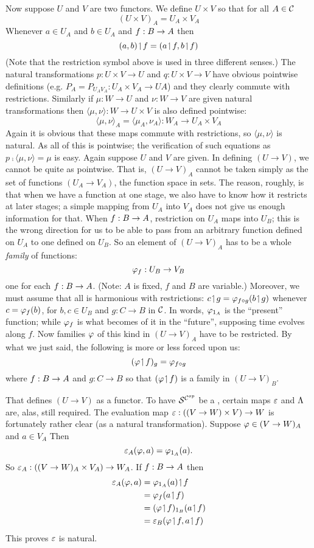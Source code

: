 Now suppose $U$ and $V$ are two functors. We define $U \times V$ so that for all $A \in \mathcal C$
$$
(U \times V)_A = U_A \times V_A
$$
%
Whenever $a \in U_A$ and $b \in U_A$ and $f: B \rightarrow A$ then
$$
(a,b) \!\upharpoonleft\! f = (a \!\upharpoonleft\! f, b \!\upharpoonleft\! f)
$$
(Note that the restriction symbol above is used in three different senses.) The natural transformations $p : U \times V \to U$ and $q: U\times V \to V$ have obvious pointwise definitions  (e.g. $P_A= P_{{U_A}{V_A}} : U_A \times V_A \to UA$) and they clearly commute with restrictions. Similarly if $\mu: W \to U$ and $\nu: W\to V$ are given natural transformations then $\langle \mu, \nu \rangle: W \to U \times V$ is also defined pointwise:
$$
{\langle \mu, \nu \rangle}_A = \langle \mu_A, \nu_A \rangle : W_A \to U_A \times V_A
$$
%
Again it is obvious that these maps commute with restrictions, so ${\langle \mu, \nu \rangle}$ is natural. As all of this is pointwise; the verifi­cation of such equations as $p \comp \langle \mu, \nu \rangle = \mu$ is easy. Again suppose $U$ and $V$ are given. In defining $(U \to V)$, we cannot be quite as pointwise. That is, $(U \to V)_A$ cannot be taken simply as the set of functions $(U_A \to V_A)$, the function space in sets. The reason, roughly, is that when we have a function at one stage, we also have to know how it restricts at later stages; a simple mapping from $U_A$ into $V_A$ does not give us enough information for that. When $f : B \rightarrow A$, restriction on
$U_A$ maps into $U_B$; this is the wrong direction for us to be able to pass from an arbitrary function defined on $U_A$ to one defined on $U_B$. So an element of $(U \to V)_A$ has to be a whole {\it family} of functions:
$$
\varphi_f: U_B \rightarrow V_B
$$
%
one for each $f: B \rightarrow A$. (Note: $A$ is fixed, $f$ and $B$ are variable.) Moreover, we must assume that all is harmonious with
restrictions: $c \!\upharpoonleft\! g = \varphi_{f \circ g} (b \!\upharpoonleft\! g)$ whenever $c = \varphi_f(b)$, for $b,c \in U_B$ and $g : C\to B$ in $\mathcal C$. In words, $\varphi_{{\textrm 1}_A}$ is the ``present'' function; while $\varphi_f$ is what becomes of it in the ``future'', sup­posing time evolves along $f$. Now families $\varphi$ of this kind in
$(U\to V)_A$ have to be restricted. By what we just said, the fol­lowing is more or less forced upon us:
$$
(\varphi \!\upharpoonleft\! f)_g = \varphi_{f\circ g}
$$
%
where $f : B \rightarrow A$ and $g: C\to B$ so that $(\varphi \!\upharpoonleft\! f)$ is a family in $(U\to V)_B$. 

That defines $(U\to V)$ as a functor. To have $\mathcal S^{\mathcal C^{op}}$ be a \ccc, certain maps $\varepsilon$ and $\Lambda$ are, alas, still required. The evaluation map $\varepsilon : ((V\rightarrow W) \times V) \rightarrow W$ is fortunately rather clear (as a natural transformation). Suppose $\varphi \in (V \rightarrow W)_A$ and $a \in V_A$ Then
$$
\varepsilon_A(\varphi, a) = \varphi_{{\textrm 1}_A} (a).
$$
%
So $\varepsilon_A : ((V \rightarrow W)_A \times V_A) \rightarrow W_A$. If $f: B \rightarrow A$ then 
\begin{align*}
\ev_A(\ffam, a) &= \ffam_{\id_A}(a) \res f\\
&= \ffam_f(a \res f)\\
&= (\ffam \res f)_{\id_B} (a \res f)\\
&= \ev_B(\ffam \res f, a \res f)
\end{align*}
%
This proves $\varepsilon$ is natural.

